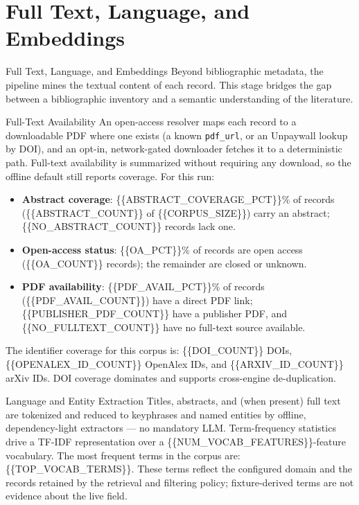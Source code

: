 \documentclass[
  ignorenonframetext,
]{beamer}
\author{}
\date{}
\providecommand{\tightlist}{%
  \setlength{\itemsep}{0pt}\setlength{\parskip}{0pt}}
\begin{document}
\section{Full Text, Language, and
Embeddings}\label{full-text-language-and-embeddings}

\begin{frame}[allowframebreaks]{Full Text, Language, and Embeddings}
Beyond bibliographic metadata, the pipeline mines the textual content of
each record. This stage bridges the gap between a bibliographic
inventory and a semantic understanding of the literature.
\end{frame}

\begin{frame}{Full-Text Availability}
\label{full-text-availability}
An open-access resolver maps each record to a downloadable PDF where one
exists (a known \texttt{pdf\_url}, or an Unpaywall lookup by DOI), and
an opt-in, network-gated downloader fetches it to a deterministic path.
Full-text availability is summarized without requiring any download, so
the offline default still reports coverage. For this run:

\begin{itemize}
\tightlist
\item
  \textbf{Abstract coverage}: \{\{ABSTRACT\_COVERAGE\_PCT\}\}\% of
  records (\{\{ABSTRACT\_COUNT\}\} of \{\{CORPUS\_SIZE\}\}) carry an
  abstract; \{\{NO\_ABSTRACT\_COUNT\}\} records lack one.
\item
  \textbf{Open-access status}: \{\{OA\_PCT\}\}\% of records are open
  access (\{\{OA\_COUNT\}\} records); the remainder are closed or
  unknown.
\item
  \textbf{PDF availability}: \{\{PDF\_AVAIL\_PCT\}\}\% of records
  (\{\{PDF\_AVAIL\_COUNT\}\}) have a direct PDF link;
  \{\{PUBLISHER\_PDF\_COUNT\}\} have a publisher PDF, and
  \{\{NO\_FULLTEXT\_COUNT\}\} have no full-text source available.
\end{itemize}

The identifier coverage for this corpus is: \{\{DOI\_COUNT\}\} DOIs,
\{\{OPENALEX\_ID\_COUNT\}\} OpenAlex IDs, and \{\{ARXIV\_ID\_COUNT\}\}
arXiv IDs. DOI coverage dominates and supports cross-engine
de-duplication.
\end{frame}

\begin{frame}[allowframebreaks]{Language and Entity Extraction}
\label{language-and-entity-extraction}
Titles, abstracts, and (when present) full text are tokenized and
reduced to keyphrases and named entities by offline, dependency-light
extractors --- no mandatory LLM. Term-frequency statistics drive a
TF-IDF representation over a \{\{NUM\_VOCAB\_FEATURES\}\}-feature
vocabulary. The most frequent terms in the corpus are:
\{\{TOP\_VOCAB\_TERMS\}\}. These terms reflect the configured domain and
the records retained by the retrieval and filtering policy;
fixture-derived terms are not evidence about the live field.
\end{frame}
\end{document}
